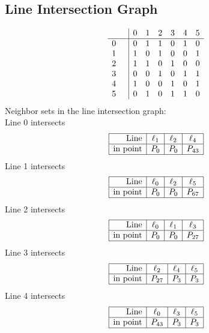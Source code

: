 \documentclass{article}
\begin{document}
{\subsection*{Line Intersection Graph}
{\arraycolsep=1pt
$$
\begin{array}{rr|*{6}r}
 &  & 0 & 1 & 2 & 3 & 4 & 5\\
\hline
0 &  & 0 & 1 & 1 & 0 & 1 & 0\\
1 &  & 1 & 0 & 1 & 0 & 0 & 1\\
2 &  & 1 & 1 & 0 & 1 & 0 & 0\\
3 &  & 0 & 0 & 1 & 0 & 1 & 1\\
4 &  & 1 & 0 & 0 & 1 & 0 & 1\\
5 &  & 0 & 1 & 0 & 1 & 1 & 0\\
\end{array}
$$
}%
Neighbor sets in the line intersection graph:\\
Line 0 intersects 
$$
\begin{array}{|r*{3}{|c}|}
\hline
\mbox{Line}  & \ell_{1} & \ell_{2} & \ell_{4}\\
\hline
\mbox{in point}  & P_{0} & P_{0} & P_{43}\\
\hline
\end{array}
$$
Line 1 intersects 
$$
\begin{array}{|r*{3}{|c}|}
\hline
\mbox{Line}  & \ell_{0} & \ell_{2} & \ell_{5}\\
\hline
\mbox{in point}  & P_{0} & P_{0} & P_{67}\\
\hline
\end{array}
$$
Line 2 intersects 
$$
\begin{array}{|r*{3}{|c}|}
\hline
\mbox{Line}  & \ell_{0} & \ell_{1} & \ell_{3}\\
\hline
\mbox{in point}  & P_{0} & P_{0} & P_{27}\\
\hline
\end{array}
$$
Line 3 intersects 
$$
\begin{array}{|r*{3}{|c}|}
\hline
\mbox{Line}  & \ell_{2} & \ell_{4} & \ell_{5}\\
\hline
\mbox{in point}  & P_{27} & P_{3} & P_{3}\\
\hline
\end{array}
$$
Line 4 intersects 
$$
\begin{array}{|r*{3}{|c}|}
\hline
\mbox{Line}  & \ell_{0} & \ell_{3} & \ell_{5}\\
\hline
\mbox{in point}  & P_{43} & P_{3} & P_{3}\\
\hline
\end{array}
$$}
\end{document}
